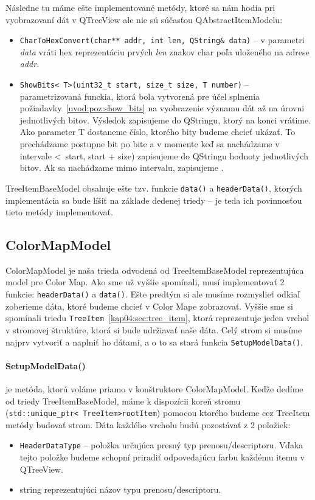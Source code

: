  Následne tu máme ešte implementované metódy, ktoré sa nám hodia pri vyobrazovaní dát v QTreeView ale nie sú súčasťou QAbstractItemModelu:
\begin{itemize}
\item \texttt{CharToHexConvert(char** addr, int len, QString\& data)} -- v parametri \textit{data} vráti hex reprezentáciu prvých \textit{len} znakov char poľa uloženého na adrese \textit{addr}.
\item \texttt{ShowBits\textless~T\textgreater(uint32\_t start, size\_t size, T number)}  -- parametrizovaná funckia, ktorá bola vytvorená pre účel splnenia požiadavky~\ref{uvod:poz:show_bits} na vyobrazenie významu dát až na úrovni jednotlivých bitov. Výsledok zapisujeme do QStringu, ktorý na konci vrátime. Ako parameter T dostaneme číslo, ktorého bity budeme chcieť ukázať. To prechádzame postupne bit po bite a v momente keď sa nachádzame v intervale \textless~start, start + size) zapisujeme do QStringu hodnoty jednotlivých bitov. Ak sa nachádzame mimo intervalu, zapisujeme .
\end{itemize}

TreeItemBaseModel obsahuje ešte tzv.  funkcie \texttt{data()} a \texttt{headerData()}, ktorých implementácia sa bude líšiť na základe dedenej triedy -- je teda ich povinnosťou tieto metódy implementovať.


\subsection{ColorMapModel}
ColorMapModel je naša trieda odvodená od TreeItemBaseModel reprezentujúca model pre Color Map. Ako sme už vyššie spomínali, musí implementovať 2 funkcie: \texttt{headerData()} a \texttt{data()}. Ešte predtým si ale musíme rozmyslieť odkiaľ zoberieme dáta, ktoré budeme chcieť v Color Mape zobrazovať. Vyššie sme si spomínali triedu \texttt{TreeItem}~\ref{kap04:sec:tree_item}, ktorá reprezentuje jeden vrchol v stromovej štruktúre, ktorá si bude udržiavať naše dáta. Celý strom si musíme najprv vytvoriť a naplniť ho dátami, a o to sa stará funkcia \texttt{SetupModelData()}.

\paragraph{SetupModelData()} je metóda, ktorú voláme priamo v konštruktore ColorMapModel. Keďže dedíme od triedy TreeItemBaseModel, máme k dispozícii koreň stromu (\texttt{std::unique\_ptr\textless~TreeItem\textgreater rootItem}) pomocou ktorého budeme cez TreeItem metódy budovať strom. Dáta každého vrcholu budú pozostávať z 2 položiek:
\begin{itemize}
\item \texttt{HeaderDataType} -- položka určujúca presný typ prenosu/descriptoru. Vďaka tejto položke budeme schopní priradiť odpovedajúcu farbu každému itemu v QTreeView.
\item string reprezentujúci názov typu prenosu/descriptoru.
\end{itemize}

